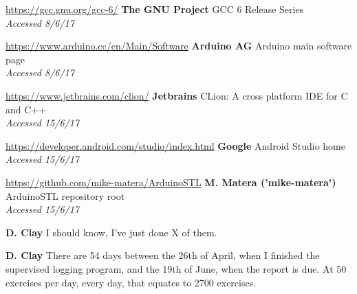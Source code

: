 \documentclass[a4paper]{article}
\begin{document}
\begin{thebibliography}{9}
\url{https://gcc.gnu.org/gcc-6/}
\textbf{The GNU Project}
GCC 6 Release Series
\\\textit{Accessed 8/6/17}

\url{https://www.arduino.cc/en/Main/Software}
\textbf{Arduino AG}
Arduino main software page
\\\textit{Accessed 8/6/17}

\url{https://www.jetbrains.com/clion/}
\textbf{Jetbrains}
CLion: A cross platform IDE for C and C++
\\\textit{Accessed 15/6/17}

\url{https://developer.android.com/studio/index.html}
\textbf{Google}
Android Studio home
\\\textit{Accessed 15/6/17}


\url{https://github.com/mike-matera/ArduinoSTL}
\textbf{M. Matera ('mike-matera')}
ArduinoSTL repository root
\\\textit{Accessed 15/6/17}

\textbf{D. Clay}
I should know, I've just done X of them. 

\textbf{D. Clay}
There are 54 days between the 26th of April, when I finished the supervised logging program, and the 19th of June, when the report is due. At 50 exercises per day, every day, that equates to 2700 exercises.


\bibitem{}
\url{}
\textbf{}
\\\textit{}

\end{thebibliography}
\end{document}
